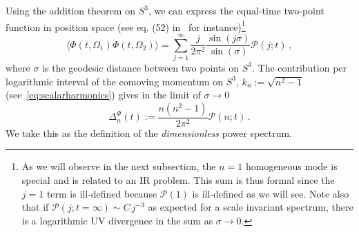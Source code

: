 \documentclass[a4paper,11pt]{article}
\begin{document}
Using the addition theorem on $S^3$, we can express the equal-time two-point function in position space (see eq. (52) in~\cite{WenAvery1985} for instance)\footnote{As we will observe in the next subsection, the $n=1$ homogeneous mode is special and is related to an IR problem. This sum is thus formal since the $j=1$ term is ill-defined because $\mathcal{P}(1)$ is ill-defined as we will see. Note also that if $\mathcal{P}(j;t=\infty)\sim C\,j^{-3}$ as expected for a scale invariant spectrum, there is a logarithmic UV divergence in the sum as $\sigma \to 0$.}
\begin{equation}
    \langle \Phi(t,\Omega_1)\Phi(t,\Omega_2) \rangle = \sum_{j=1}^{\infty}\frac{j}{2\pi^2}\frac{\sin(j\sigma)}{\sin(\sigma)}\mathcal{P}(j;t)\,,
\end{equation}
where $\sigma$ is the geodesic distance between two points on $S^3$. The contribution per logarithmic interval of the comoving momentum on $S^3$, $k_n:=\sqrt{n^2-1}$ (see~\eqref{eq:scalarharmonics}) gives in the limit of $\sigma\to0$
\begin{equation}
    \Delta^{\Phi}_n(t):= \frac{n(n^2-1)}{2\pi^2}\mathcal{P}(n;t)\,.
\end{equation}
We take this as the definition of the \textit{dimensionless} power spectrum.
\end{document}

